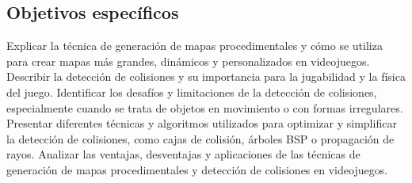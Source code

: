 \documentclass[stu, 12pt, letterpaper, donotrepeattitle, floatsintext, natbib]{apa7}
\newcommand{\myparagraph}[1]{\paragraph{#1}\mbox{}\\}
\begin{document}
\subsection{Objetivos específicos} 
Explicar la técnica de generación de mapas procedimentales y cómo se utiliza para crear mapas más grandes, dinámicos y personalizados en videojuegos.
Describir la detección de colisiones y su importancia para la jugabilidad y la física del juego.
Identificar los desafíos y limitaciones de la detección de colisiones, especialmente cuando se trata de objetos en movimiento o con formas irregulares.
Presentar diferentes técnicas y algoritmos utilizados para optimizar y simplificar la detección de colisiones, como cajas de colisión, árboles BSP o propagación de rayos.
Analizar las ventajas, desventajas y aplicaciones de las técnicas de generación de mapas procedimentales y detección de colisiones en videojuegos.

\newpage
\renewcommand\refname{\large\textbf{Referencias}}

\end{document}
